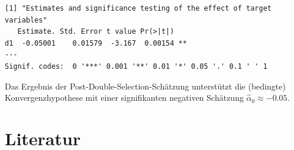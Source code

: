 \documentclass[
  a4paper,
  DIV=11,
  oneside]{scrreprt}
\begin{document}
\begin{verbatim}
[1] "Estimates and significance testing of the effect of target variables"
   Estimate. Std. Error t value Pr(>|t|)   
d1  -0.05001    0.01579  -3.167  0.00154 **
---
Signif. codes:  0 '***' 0.001 '**' 0.01 '*' 0.05 '.' 0.1 ' ' 1
\end{verbatim}

Das Ergebnis der Post-Double-Selection-Schätzung unterstützt die
(bedingte) Konvergenzhypothese mit einer signifikanten negativen
Schätzung \(\widehat{\alpha}_0\approx-0.05\).


\hypertarget{literatur}{%
\chapter*{Literatur}\label{literatur}}

\end{document}
